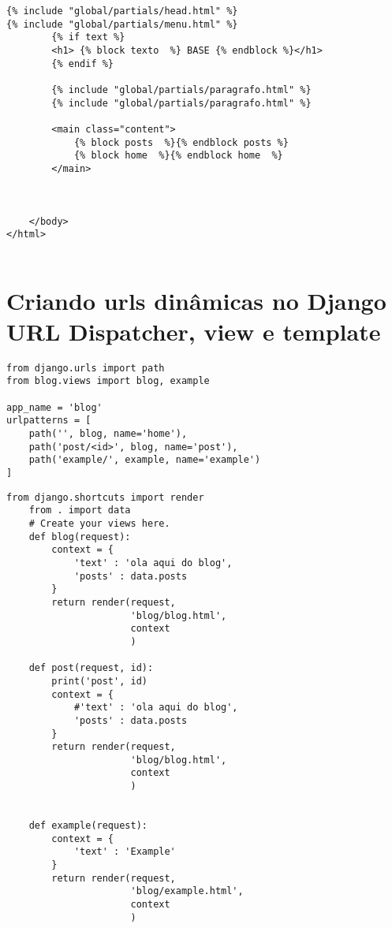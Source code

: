 \documentclass{article}
\begin{document}
\begin{lstlisting}[style=djangohtml, caption={base/global/base.html}]
    {% include "global/partials/head.html" %}
{% include "global/partials/menu.html" %}
        {% if text %}
        <h1> {% block texto  %} BASE {% endblock %}</h1>
        {% endif %}
        
        {% include "global/partials/paragrafo.html" %}
        {% include "global/partials/paragrafo.html" %}

        <main class="content">
            {% block posts  %}{% endblock posts %}
            {% block home  %}{% endblock home  %}  
        </main>
        
        
        
    </body>
</html>
   
\end{lstlisting}

\section{Criando urls dinâmicas no Django  URL Dispatcher, view e template}

\begin{lstlisting}[style=pythonStyle, caption={blog/urls.py}]
from django.urls import path
from blog.views import blog, example

app_name = 'blog'
urlpatterns = [
    path('', blog, name='home'),
    path('post/<id>', blog, name='post'),
    path('example/', example, name='example')
]

\end{lstlisting}
\begin{lstlisting}[style=pythonStyle, caption={blog/views.py}]
    from django.shortcuts import render
    from . import data
    # Create your views here.
    def blog(request):
        context = {
            'text' : 'ola aqui do blog',
            'posts' : data.posts
        }
        return render(request,
                      'blog/blog.html', 
                      context
                      )
    
    def post(request, id):
        print('post', id)
        context = {
            #'text' : 'ola aqui do blog',
            'posts' : data.posts
        }
        return render(request,
                      'blog/blog.html', 
                      context
                      )
    
    
    def example(request):
        context = {
            'text' : 'Example'
        }
        return render(request, 
                      'blog/example.html', 
                      context
                      )
    
\end{lstlisting}
\end{document}
